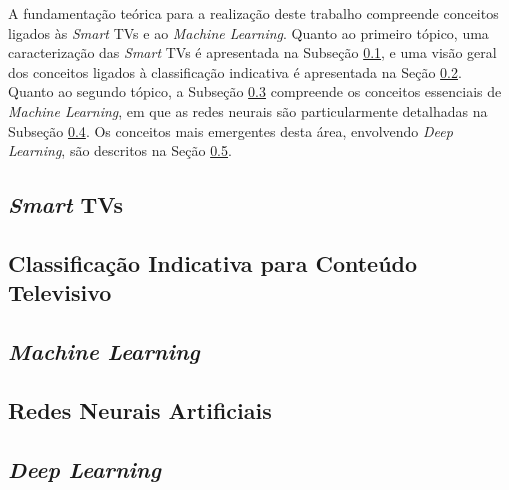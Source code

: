 
A fundamentação teórica para a realização deste trabalho compreende conceitos ligados às  \emph{Smart} TVs e ao \emph{Machine Learning}. Quanto ao primeiro tópico, uma caracterização das \emph{Smart} TVs é apresentada na Subseção \ref{sec:smarttv}, e uma visão geral dos conceitos ligados à classificação indicativa é apresentada na Seção \ref{sec:classificacaoIndicativa}. Quanto ao segundo tópico, a Subseção \ref{sec:machineLearning} compreende os conceitos essenciais de \emph{Machine Learning}, em que as redes neurais são particularmente detalhadas na Subseção \ref{sec:rnas}. Os conceitos mais emergentes desta área, envolvendo \emph{Deep Learning}, são descritos na Seção \ref{sec:dl}.

\subsection{\emph{Smart} TVs} \label{sec:smarttv}


\subsection{Classificação Indicativa para Conteúdo Televisivo} \label{sec:classificacaoIndicativa}


\subsection{\emph{Machine Learning}} \label{sec:machineLearning}


\subsection{Redes Neurais Artificiais} \label{sec:rnas}


\subsection{\emph{Deep Learning}}\label{sec:dl}

